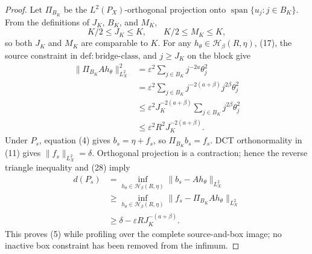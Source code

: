 \documentclass{article}
\begin{document}
\begin{proof}
Let \(\Pi_{B_K}\) be the \(L^2(P_X)\)-orthogonal projection onto \(\operatorname{span}\{u_j:j\in B_K\}\).  From the definitions of \(J_K\), \(B_K\), and \(M_K\),
\[
K/2\le J_K\le K,
\qquad
K/2\le M_K\le K,
\tag{27}
\]
so both \(J_K\) and \(M_K\) are comparable to \(K\).  For any \(h_\theta\in\mathcal H_\beta(R,\eta)\), (17), the source constraint in \(\mathrm{def:bridge\mbox{-}class}\), and \(j\ge J_K\) on the block give
\[
\begin{aligned}
\|\Pi_{B_K}Ah_\theta\|_{L^2_X}^2
&=\varepsilon^2\sum_{j\in B_K}j^{-2a}\theta_j^2 \\
&=\varepsilon^2\sum_{j\in B_K}j^{-2(a+\beta)}j^{2\beta}\theta_j^2 \\
&\le\varepsilon^2J_K^{-2(a+\beta)}
       \sum_{j\in B_K}j^{2\beta}\theta_j^2 \\
&\le\varepsilon^2R^2J_K^{-2(a+\beta)}.
\end{aligned}
\tag{28}
\]
Under \(P_s\), equation (4) gives \(b_s=\eta+f_s\), so \(\Pi_{B_K}b_s=f_s\).  DCT orthonormality in (11) gives \(\|f_s\|_{L^2_X}=\delta\).  Orthogonal projection is a contraction; hence the reverse triangle inequality and (28) imply
\[
\begin{aligned}
d(P_s)
&=\inf_{h_\theta\in\mathcal H_\beta(R,\eta)}
  \|b_s-Ah_\theta\|_{L^2_X} \\
&\ge\inf_{h_\theta\in\mathcal H_\beta(R,\eta)}
  \|f_s-\Pi_{B_K}Ah_\theta\|_{L^2_X} \\
&\ge\delta-\varepsilon R J_K^{-(a+\beta)}.
\end{aligned}
\tag{29}
\]
This proves (5) while profiling over the complete source-and-box image; no inactive box constraint has been removed from the infimum.


\end{proof}
\end{document}
